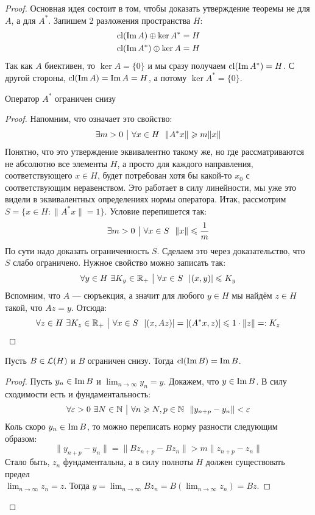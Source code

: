 \begin{proof}
	Основная идея состоит в том, чтобы доказать утверждение теоремы не для $A$, а для $A^*$. Запишем 2 разложения пространства $H$:
	\begin{align*}
		&{\operatorname{cl}(\operatorname{Im} A) \oplus \ker A^* = H}
		\\
		&{\operatorname{cl}(\operatorname{Im} A^*) \oplus \ker A = H}
	\end{align*}
	Так как $A$ биективен, то $\ker A = \{0\}$ и мы сразу получаем $\operatorname{cl}(\operatorname{Im} A^*) = H$. С другой стороны, $\operatorname{cl}(\operatorname{Im} A) = \operatorname{Im} A = H$, а потому $\ker A^* = \{0\}$.
	\begin{lemma} \label{conj_op_bot_bounded_lemma}
		Оператор $A^*$ ограничен снизу
	\end{lemma}
	
	\begin{proof}
		Напомним, что означает это свойство:
		\[
			\exists m > 0 \such \forall x \in H\ \ \|A^*x\| \ge m\|x\|
		\]
		Понятно, что это утверждение эквивалентно такому же, но где рассматриваются не абсолютно все элементы $H$, а просто для каждого направления, соответствующего $x \in H$, будет потребован хотя бы какой-то $x_0$ с соответствующим неравенством. Это работает в силу линейности, мы уже это видели в эквивалентных определениях нормы оператора. Итак, рассмотрим $S = \{x \in H \colon \|A^*x\| = 1\}$. Условие перепишется так:
		\[
			\exists m > 0 \ \big|\  \forall x \in S\ \ \|x\| \leqslant \frac{1}{m}
		\]
		По сути надо доказать ограниченность $S$. Сделаем это через доказательство, что $S$ слабо ограничено. Нужное свойство можно записать так:
		\[
			\forall y \in H\ \exists K_y \in \mathbb{R}_+ \ \big|\  \forall x \in S\ \ |(x, y)| \leqslant K_y
		\]
		Вспомним, что $A$ --- сюръекция, а значит для любого $y \in H$ мы найдём $z \in H$ такой, что $Az = y$. Отсюда:
		\[
			\forall z \in H\ \exists K_z \in \mathbb{R}_+ \ \big|\  \forall x \in S\ \ |(x, Az)| = |(A^*x, z)| \leqslant 1 \cdot \|z\| =: K_z
		\]
	\end{proof}
	
	
	\begin{lemma} \label{op_bot_bounded_im}
		Пусть $B \in \mathcal{L}(H)$ и $B$ ограничен снизу. Тогда $\operatorname{cl}(\operatorname{Im} B) = \operatorname{Im} B$.
	\end{lemma}
	
	\begin{proof}
		Пусть $y_n \in \operatorname{Im} B$ и $\lim_{n \to \infty} y_n = y$. Докажем, что $y \in \operatorname{Im} B$. В силу сходимости есть и фундаментальность:
		\[
			\forall \varepsilon > 0\ \exists N \in \mathbb{N} \ \big|\  \forall n \geqslant N, p \in \mathbb{N}\ \ \|y_{n + p} - y_n\| < \varepsilon
		\]
		Коль скоро $y_n \in \operatorname{Im} B$, то можно переписать норму разности следующим образом:
		\[
			\|y_{n + p} - y_n\| = \|Bz_{n + p} - Bz_n\| > m\|z_{n + p} - z_n\|
		\]
		Стало быть, $z_n$ фундаментальна, а в силу полноты $H$ должен существовать предел \\ $\lim_{n \to \infty} z_n = z$. Тогда $y = \lim_{n \to \infty} Bz_n = B( \lim_{n \to \infty} z_n) = Bz$.
	\end{proof}
	

\end{proof}
